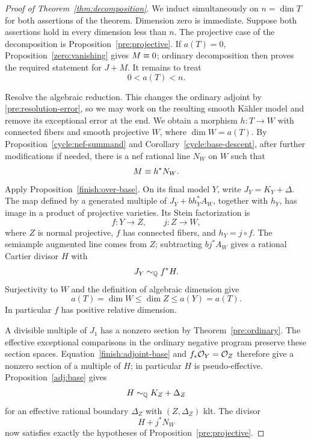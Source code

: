 \begin{proof}[Proof of Theorem~\ref{thm:decomposition}]
We induct simultaneously on \(n=\dim T\) for both assertions of the
theorem. Dimension zero is immediate. Suppose both assertions hold in
every dimension less than \(n\). The projective case of the decomposition
is Proposition~\ref{pre:projective}. If \(a(T)=0\),
Proposition~\ref{zero:vanishing} gives \(M\equiv0\); ordinary decomposition
then proves the required statement for \(J+M\). It remains to treat
\[
 0<a(T)<n.
\]

Resolve the algebraic reduction. This changes the ordinary adjoint by
\eqref{pre:resolution-error}, so we may work on the resulting smooth
K\"ahler model and remove its exceptional error at the end.
We obtain a morphism \(h:T\to W\) with connected fibers and smooth
projective \(W\), where \(\dim W=a(T)\).
By Proposition~\ref{cycle:nef-summand} and
Corollary~\ref{cycle:base-descent}, after further modifications if
needed, there is a nef rational line \(N_W\) on \(W\) such that
\begin{equation}\label{finish:nef-descent}
 M\equiv h^*N_W.
\end{equation}
Apply Proposition~\ref{finish:over-base}. On its final model \(Y\),
write \(J_Y=K_Y+\Delta\). The map defined by a generated multiple of
\(J_Y+b h_Y^*A_W\), together with \(h_Y\), has image in a product of
projective varieties. Its Stein factorization is
\[
 f:Y\longrightarrow Z,\qquad j:Z\longrightarrow W,
\]
where \(Z\) is normal projective, \(f\) has connected fibers, and
\(h_Y=j\circ f\). The semiample augmented line comes from \(Z\);
subtracting \(b j^*A_W\) gives a rational Cartier divisor \(H\) with
\begin{equation}\label{finish:adjoint-base}
 J_Y\sim_{\mathbb Q} f^*H.
\end{equation}
Surjectivity to \(W\) and the definition of algebraic dimension give
\[
 a(T)=\dim W\leq\dim Z\leq a(Y)=a(T).
\]
In particular \(f\) has positive relative dimension.

A divisible multiple of \(J_1\) has a nonzero section by
Theorem~\ref{pre:ordinary}. The effective exceptional comparisons in
the ordinary negative program preserve these section spaces.
Equation~\eqref{finish:adjoint-base} and \(f_*\mathcal O_Y=\mathcal O_Z\) therefore
give a nonzero section of a multiple of \(H\); in particular \(H\)
is pseudo-effective. Proposition~\ref{adj:base} gives
\[
 H\sim_{\mathbb Q} K_Z+\Delta_Z
\]
for an effective rational boundary \(\Delta_Z\) with \((Z,\Delta_Z)\)
klt. The divisor
\[
 H+j^*N_W
\]
now satisfies exactly the hypotheses of Proposition~\ref{pre:projective}.


\end{proof}
